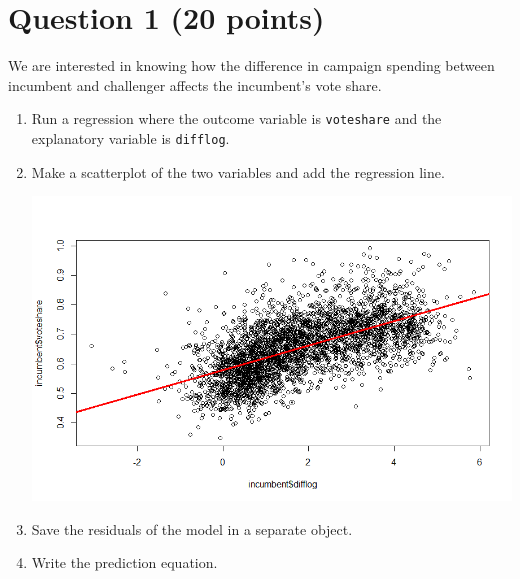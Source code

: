 \documentclass[12pt,letterpaper]{article}
\begin{document}
\section*{Question 1 (20 points)}
\vspace{.25cm}
\noindent We are interested in knowing how the difference in campaign spending between incumbent and challenger affects the incumbent's vote share. 
	\begin{enumerate}
		\item Run a regression where the outcome variable is \texttt{voteshare} and the explanatory variable is \texttt{difflog}.	
		
		
		
		\vspace{5cm}
		
		\item Make a scatterplot of the two variables and add the regression line. 	
		
		 
		
		\includegraphics[scale=.75]{plot1.png}
		
		\vspace{5cm}
		\item Save the residuals of the model in a separate object.	
		
		 
		
		\vspace{7cm}
		\item Write the prediction equation. 
		
		
		
	\end{enumerate}
	
\end{document}
